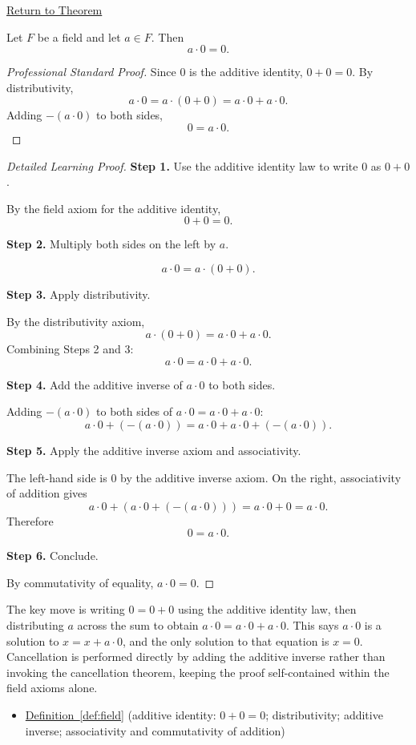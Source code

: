 \newpage
{}
\label{prf:zero-product}

\begin{remark*}[Return]
\hyperref[thm:zero-product]{Return to Theorem}
\end{remark*}

\begin{theorem*}
Let $F$ be a field and let $a\in F$.  Then
\[
a\cdot 0 = 0.
\]
\end{theorem*}

\begin{proof}[Professional Standard Proof]
\LRAProofBodyStart
Since $0$ is the additive identity, $0 + 0 = 0$.  By distributivity,
\[
a\cdot 0 = a\cdot(0 + 0) = a\cdot 0 + a\cdot 0.
\]
Adding $-(a\cdot 0)$ to both sides,
\[
0 = a\cdot 0.
\]
\end{proof}

\begin{proof}[Detailed Learning Proof]
\LRAProofBodyStart

\textbf{Step 1.} Use the additive identity law to write $0$ as $0 + 0$.

By the field axiom for the additive identity,
\[
0 + 0 = 0.
\]

\textbf{Step 2.} Multiply both sides on the left by $a$.

\[
a \cdot 0 = a \cdot (0 + 0).
\]

\textbf{Step 3.} Apply distributivity.

By the distributivity axiom,
\[
a \cdot (0 + 0) = a\cdot 0 + a\cdot 0.
\]
Combining Steps 2 and 3:
\[
a\cdot 0 = a\cdot 0 + a\cdot 0.
\]

\textbf{Step 4.} Add the additive inverse of $a\cdot 0$ to both sides.

Adding $-(a\cdot 0)$ to both sides of $a\cdot 0 = a\cdot 0 + a\cdot 0$:
\[
a\cdot 0 + (-(a\cdot 0)) = a\cdot 0 + a\cdot 0 + (-(a\cdot 0)).
\]

\textbf{Step 5.} Apply the additive inverse axiom and associativity.

The left-hand side is $0$ by the additive inverse axiom.  On the right,
associativity of addition gives
\[
a\cdot 0 + (a\cdot 0 + (-(a\cdot 0))) = a\cdot 0 + 0 = a\cdot 0.
\]
Therefore
\[
0 = a\cdot 0.
\]

\textbf{Step 6.} Conclude.

By commutativity of equality, $a\cdot 0 = 0$.
\end{proof}

\begin{remark*}
The key move is writing $0 = 0 + 0$ using the additive identity law, then
distributing $a$ across the sum to obtain $a\cdot 0 = a\cdot 0 + a\cdot 0$.
This says $a\cdot 0$ is a solution to $x = x + a\cdot 0$, and the only
solution to that equation is $x = 0$.  Cancellation is performed directly
by adding the additive inverse rather than invoking the cancellation theorem,
keeping the proof self-contained within the field axioms alone.
\end{remark*}

\begin{dependencies}
\begin{itemize}
  \item \hyperref[def:field]{Definition~\ref*{def:field}}
        \textnormal{(additive identity: $0+0=0$; distributivity; additive inverse;
        associativity and commutativity of addition)}
\end{itemize}
\end{dependencies}

\clearpage
